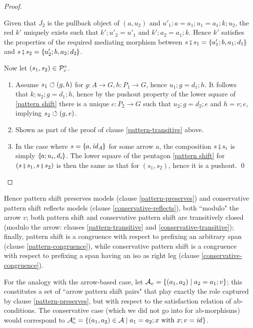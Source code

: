 \begin{proof}
\begin{enumerate}[topsep=\smallskipamount]
\begin{center}
\end{center}
%
Given that $J_2$ is the pullback object of $(a,u_2)$ and $u'_1;a=a_1;u_1=a_1;k;u_2$, the red $k'$ uniquely exists such that $k';u'_2=u'_1$ and $k';a_2=a_1;k$. Hence $k'$ satisfies the properties of the required mediating morphism between $s\spcomp s_1=\spanof{u'_1;b}{a_1;d_1}$ and $s\spcomp s_2=\spanof{u'_2;b}{a_2;d_2}$.
\end{enumerate}
%
Now let $(s_1,s_2)\in \mathcal{P}^\circ_v$.
%
\begin{enumerate}[resume,topsep=\smallskipamount]
\item Assume $s_1\circlearrowleft (g,h)$ for $g:A\to G,h:P_1\to G$, hence $u_1;g=d_1;h$. It follows that $k;u_2;g=d_1;h$, hence by the pushout property of the lower square of \eqref{pattern shift} there is a unique $e:P_2\to G$ such that $u_2;g=d_2;e$ and $h=v;e$, implying $s_2\circlearrowleft (g,e)$.

\item Shown as part of the proof of clause \ref{pattern-transitive} above.

\item In the case where $s=\spanof{a}{\id_A}$ for some arrow $a$, the composition $s \fatsemi s_i$ is simply $\spanof{a;u_i}{d_i}$. The lower square of the pentagon \eqref{pattern shift} for $(s\fatsemi s_1,s\fatsemi s_2)$ is then the same as that for $(s_1,s_2)$, hence it is a pushout.
\qed
\end{enumerate}
\end{proof}
%
Hence pattern shift preserves models (clause \ref{pattern-preserves}) and conservative pattern shift reflects models (clause \ref{conservative-reflects}), both ``modulo" the arrow $v$; both pattern shift and conservative pattern shift are transitively closed (modulo the arrow: clauses \ref{pattern-transitive} and \ref{conservative-transitive}); finally, pattern shift is a congruence with respect to prefixing an arbitrary span (clause \ref{pattern-congruence}), while conservative pattern shift is a congruence with respect to prefixing a span having an iso as right leg  (clause \ref{conservative-congruence}).

For the analogy with the arrow-based case, let $\mathcal{A}_v=\{{(a_1,a_2)\mid a_2=a_1;v}\}$; this constitutes a set of ``arrow pattern shift pairs" that play exactly the role captured by clause \ref{pattern-preserves}, but with respect to the satisfaction relation of ab-conditions. The conservative case (which we did not go into for ab-morphisms) would correspond to $\mathcal{A}^\circ_v=\{{(a_1,a_2)\in \mathcal{A}\mid a_1=a_2;x \text{ with } x;v=\mathit{id}}\}$.

